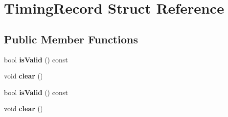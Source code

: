 \hypertarget{structTimingRecord}{\section{Timing\-Record Struct Reference}
\label{structTimingRecord}
}
\subsection*{Public Member Functions}
\begin{DoxyCompactItemize}
\item 
\hypertarget{structTimingRecord_a9db9cbe88ebc04474ddb73e38e09b3a5}{bool {\bfseries is\-Valid} () const }\label{structTimingRecord_a9db9cbe88ebc04474ddb73e38e09b3a5}

\item 
\hypertarget{structTimingRecord_ab2ace629b65745ca1d4e290ae3250306}{void {\bfseries clear} ()}\label{structTimingRecord_ab2ace629b65745ca1d4e290ae3250306}

\item 
\hypertarget{structTimingRecord_a9db9cbe88ebc04474ddb73e38e09b3a5}{bool {\bfseries is\-Valid} () const }\label{structTimingRecord_a9db9cbe88ebc04474ddb73e38e09b3a5}

\item 
\hypertarget{structTimingRecord_ab2ace629b65745ca1d4e290ae3250306}{void {\bfseries clear} ()}\label{structTimingRecord_ab2ace629b65745ca1d4e290ae3250306}

\end{DoxyCompactItemize}
